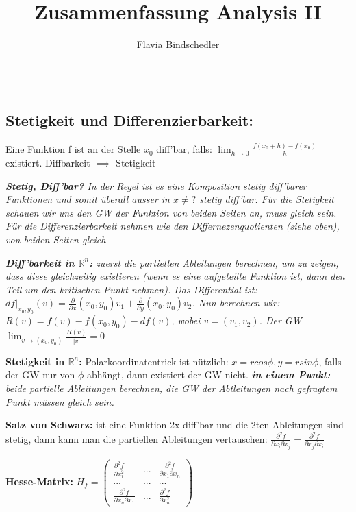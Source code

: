 \documentclass[a3paper, ngerman, 8pt]{article}
\title{Zusammenfassung Analysis II}
\author{Flavia Bindschedler}
\begin{document}
\makeatletter
{\Large \textbf{\@title}}
\hfill
{\@author}
\makeatother
\hrule

\begin{multicols*}{3}

\subsection*{Stetigkeit und Differenzierbarkeit:} Eine Funktion f ist an der Stelle $x_0$ diff'bar, falls: $ \lim_{h \to 0} \frac{f(x_0+h)-f(x_0)}{h}$ existiert. Diffbarkeit $\implies$ Stetigkeit

\textit{\textbf{Stetig, Diff'bar?} In der Regel ist es eine Komposition stetig diff'barer Funktionen und somit überall ausser in $x\neq ?$ stetig diff'bar. Für die Stetigkeit schauen wir uns den GW der Funktion von beiden Seiten an, muss gleich sein. Für die Differenzierbarkeit nehmen wie den Differnezenquotienten (siehe oben), von beiden Seiten gleich}

\textit{\textbf{Diff'barkeit in $\mathbb{R}^n$:} zuerst die partiellen Ableitungen berechnen, um zu zeigen, dass diese gleichzeitig existieren (wenn es eine aufgeteilte Funktion ist, dann den Teil um den kritischen Punkt nehmen). Das Differential ist: $df \vert _{{x_0, y_0}} (v) = \frac{\partial }{\partial x} (x_0, y_0)v_1 + \frac{\partial }{\partial y}(x_0, y_0)v_2$. Nun berechnen wir: $R(v)=f(v) - f(x_0, y_0) - df(v)$, wobei $v=(v_1, v_2)$. Der GW  $\lim_{v \to (x_0, y_0)} \frac{R(v)}{\vert v \vert} = 0$}

\textbf{Stetigkeit in $\mathbb{R}^n$:} Polarkoordinatentrick ist nützlich: $x= rcos\phi, y=rsin\phi$, falls der GW nur von $\phi$ abhängt, dann existiert der GW nicht. \textit{\textbf{in einem Punkt:} beide partielle Ableitungen berechnen, die GW der Abtleitungen nach gefragtem Punkt müssen gleich sein.}

\textbf{Satz von Schwarz:} ist eine Funktion 2x diff'bar und die 2ten Ableitungen sind stetig, dann kann man die partiellen Ableitungen vertauschen: $\frac{\partial ^2 f}{\partial x_i \partial x_j}= \frac{\partial ^2 f}{\partial x_j \partial x_i}$

\textbf{Hesse-Matrix:} $H_f=\begin{pmatrix}
\frac{\partial ^2 f}{\partial x_1^2} & ... &\frac{\partial ^2 f}{\partial x_1 \partial x_n} \\
...& ... & ... \\
\frac{\partial ^2 f}{\partial x_n \partial x_1} & ... & \frac{\partial ^2 f}{\partial x_n^2}
\end{pmatrix}$ 


\end{multicols*}
\end{document}
